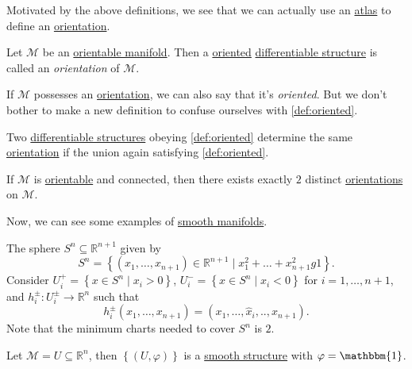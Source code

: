 Motivated by the above definitions, we see that we can actually use an \hyperref[def:atlas]{atlas} to define an \hyperref[def:orientation]{orientation}.

\begin{definition}[Orientation]\label{def:orientation}
	Let \(\mathcal{M} \) be an \hyperref[def:orientable]{orientable manifold}. Then a \hyperref[def:oriented]{oriented} \hyperref[def:smooth-structure]{differentiable structure} is called an \emph{orientation} of \(\mathcal{M} \).
\end{definition}

If \(\mathcal{M} \) possesses an \hyperref[def:orientation]{orientation}, we can also say that it's \emph{oriented}. But we don't bother to make a new definition to confuse ourselves with \autoref{def:oriented}.

\begin{remark}
	Two \hyperref[def:smooth-structure]{differentiable structures} obeying \autoref{def:oriented} determine the same \hyperref[def:orientation]{orientation} if the union again satisfying \autoref{def:oriented}.
\end{remark}

\begin{remark}
	If \(\mathcal{M} \) is \hyperref[def:orientable]{orientable} and connected, then there exists exactly \(2\) distinct \hyperref[def:orientation]{orientations} on \(\mathcal{M} \).
\end{remark}

Now, we can see some examples of \hyperref[def:smooth-manifold]{smooth manifolds}.

\begin{eg}[Sphere]
	The sphere \(S^n \subseteq \mathbb{R} ^{n+1}\) given by
	\[
		S^n = \left\{ (x_1, \ldots , x_{n+1} )\in \mathbb{R} ^{n+1} \mid x_1^2 + \ldots + x_{n+1}^2 g 1 \right\}.
	\]
	Consider \(U_i^+ = \left\{ x\in S^n \mid x_i > 0 \right\} \), \(U_i^-=\left\{ x\in S^n \mid x_i < 0 \right\} \) for \(i = 1, \ldots , n+1\), and \(h_i^{\pm} \colon U_i^{\pm} \to \mathbb{R} ^n\) such that
	\[
		h_i^{\pm}(x_1, \ldots , x_{n+1}) = (x_1, \ldots , \hat{x} _i, .., x_{n+1}).
	\]
	Note that the minimum charts needed to cover \(S^n\) is \(2\).
\end{eg}

\begin{eg}
	Let \(\mathcal{M} = U \subseteq \mathbb{R} ^n\), then \(\left\{ (U, \varphi ) \right\} \) is a \hyperref[def:smooth-structure]{smooth structure} with \(\varphi = \mathbbm{1}\).
\end{eg}

